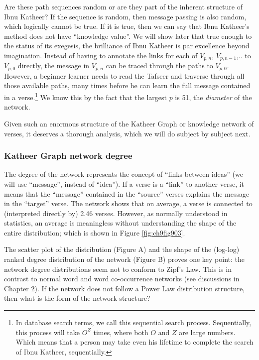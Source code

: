 \documentclass[
]{article}
\begin{document}
Are these path sequences random or are they part of the inherent structure of Ibnu Katheer? If the sequence is random, then message passing is also random, which logically cannot be true. If it is true, then we can say that Ibnu Katheer's method does not have ``knowledge value''. We will show later that true enough to the status of its exegesis, the brilliance of Ibnu Katheer is par excellence beyond imagination. Instead of having to annotate the links for each of \(V_{p,n}\), \(V_{p,n-1}\),.. to \(V_{p,0}\) directly, the message in \(V_{p,n}\) can be traced through the paths to \(V_{p,0}\). However, a beginner learner needs to read the Tafseer and traverse through all those available paths, many times before he can learn the full message contained in a verse.\footnote{In database search terms, we call this sequential search process. Sequentially, this process will take \(O^Z\) times, where both \(O\) and \(Z\) are large numbers. Which means that a person may take even his lifetime to complete the search of Ibnu Katheer, sequentially.} We know this by the fact that the largest \(p\) is 51, the \emph{diameter} of the network.

Given such an enormous structure of the Katheer Graph or knowledge network of verses, it deserves a thorough analysis, which we will do subject by subject next.

\hypertarget{katheer-graph-network-degree}{%
\subsubsection{Katheer Graph network degree}\label{katheer-graph-network-degree}}

The degree of the network represents the concept of ``links between ideas'' (we will use ``message'', instead of ``idea''). If a verse is a ``link'' to another verse, it means that the ``message'' contained in the ``source'' verses explains the message in the ``target'' verse. The network shows that on average, a verse is connected to (interpreted directly by) 2.46 verses. However, as normally understood in statistics, an average is meaningless without understanding the shape of the entire distribution; which is shown in Figure \ref{fig:ch9fig903}.

The scatter plot of the distribution (Figure A) and the shape of the (log-log) ranked degree distribution of the network (Figure B) proves one key point: the network degree distributions seem not to conform to Zipf's Law. This is in contrast to normal word and word co-occurrence networks (see discussions in Chapter 2). If the network does not follow a Power Law distribution structure, then what is the form of the network structure?
\end{document}
